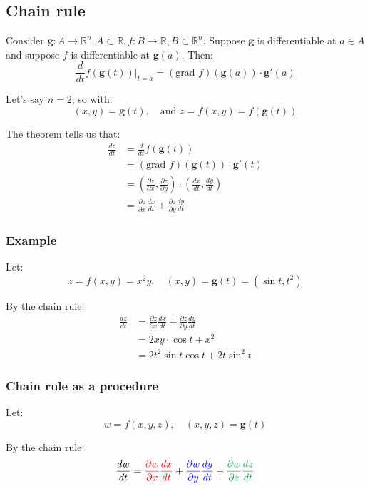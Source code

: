 \documentclass[11pt]{article}
\begin{document}
\subsection{Chain rule}
\label{sec:orgbe65322}
Consider \(\boldsymbol{g} : A \rightarrow \mathbb{R}^n, A \subset \mathbb{R}, f : B \rightarrow \mathbb{R}, B \subset \mathbb{R}^n\). Suppose \(\boldsymbol{g}\) is differentiable at \(a \in A\) and suppose \(f\) is differentiable at \(\boldsymbol{g}(a)\). Then:
\[\frac{d}{dt} f(\boldsymbol{g}(t))|_{t = a} = (\text{grad } f)(\boldsymbol{g}(a)) \cdot \boldsymbol{g}'(a)\]

Let's say \(n = 2\), so with:
\[(x, y) = \boldsymbol{g}(t), \quad \text{and } z = f(x, y) = f(\boldsymbol{g}(t))\]

The theorem tells us that:
\begin{align*}
\frac{dz}{dt} &= \frac{d}{dt}f(\boldsymbol{g}(t)) \\
&= (\text{grad } f)(\boldsymbol{g}(t)) \cdot \boldsymbol{g}'(t) \\
&= \left(\frac{\partial z}{\partial x}, \frac{\partial z}{\partial y} \right) \cdot \left( \frac{dx}{dt}, \frac{dy}{dt} \right) \\
&= \frac{\partial z}{\partial x} \frac{dx}{dt} + \frac{\partial z}{\partial y} \frac{dy}{dt}
\end{align*}
\subsubsection{Example}
\label{sec:org39aec18}
Let:
\[z = f(x, y) = x^2 y, \quad (x, y) = \boldsymbol{g}(t) = (\sin t, t^2)\]

By the chain rule:
\begin{align*}
\frac{dz}{dt} &= \frac{\partial z}{\partial x} \frac{dx}{dt} + \frac{\partial z}{\partial y} \frac{dy}{dt} \\
&= 2xy \cdot \cos t + x^2 \\
&= 2t^2 \sin t \cos t + 2t \sin^2 t
\end{align*}

\newpage
\subsubsection{Chain rule as a procedure}
\label{sec:org453e9e8}
Let:
\[w = f(x, y, z), \quad (x, y, z) = \boldsymbol{g}(t)\]

By the chain rule:
\[\frac{dw}{dt} = \textcolor{red}{\frac{\partial w}{\partial x} \frac{dx}{dt}} + \textcolor{blue}{\frac{\partial w}{\partial y} \frac{dy}{dt}} + \textcolor{ForestGreen}{\frac{\partial w}{\partial z} \frac{dz}{dt}}\]
\end{document}
